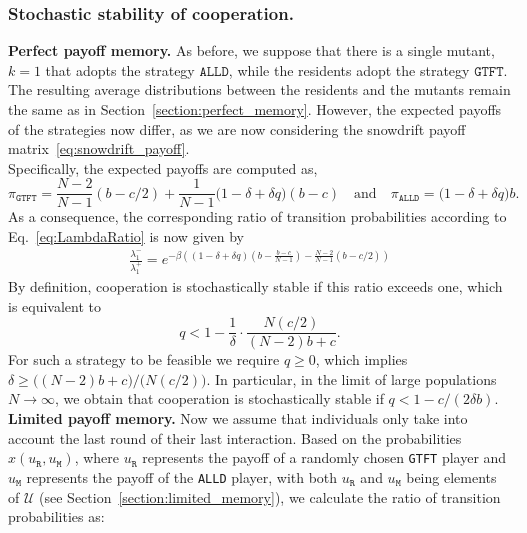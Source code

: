 \documentclass[11pt]{article}
\def\alld{\texttt{ALLD}}
\def\gtft{\texttt{GTFT}}
\def\resident{\texttt{R}}
\def\mutant{\texttt{M}}
\theoremstyle{plainCl1}
\theoremstyle{plainCl2}
\begin{document}
\subsubsection{Stochastic stability of cooperation.}\label{section:stochastic_stability_snowdrift}

{\bf Perfect payoff memory.} As before, we suppose that there is a single mutant,
\(k\!=\!1\) that adopts the strategy $\alld$, while the residents adopt the
strategy \(\gtft\). The resulting average distributions between the residents
and the mutants remain the same as in Section~\ref{section:perfect_memory}.
However, the expected payoffs of the strategies now differ, as we are now
considering the snowdrift payoff matrix~\eqref{eq:snowdrift_payoff}. \\

\noindent
Specifically, the expected payoffs are computed as,
\begin{equation*}
  \pi_\gtft =  \frac{N\!-\!2}{N-1} (b - c/2)  \!+\! \frac{1}{N-1}\big(1\!-\!\delta\!+\!\delta q\big)(b - c)
  \quad \text{and} \quad
  \pi_\alld  = \big(1\!-\!\delta\!+\!\delta q\big)b.
\end{equation*}
As a consequence, the corresponding ratio of transition probabilities according
to Eq.~\eqref{eq:LambdaRatio} is now given by
\begin{align*}
\frac{\lambda_1^{-}}{\lambda_1^{+}} = e^{-\beta \left( (1-\delta+\delta q)(b - \frac{b-c}{N-1})- \frac{N-2}{N-1}(b-c/2) \right)}
\end{align*}
By definition, cooperation is stochastically stable if this ratio exceeds one, which is equivalent to
\begin{equation}\label{Eq:Condition_PerfectMemory_Snowdrift}
q<1-\frac{1}{\delta}\cdot \frac{N(c/2)}{(N\!-\!2)b+c}.
\end{equation}
For such a strategy to be feasible we require $q\!\ge\!0$, which implies $\delta
\!\ge\! \big((N\!-\!2)b+c\big)/\big(N(c/2)\big)$. In particular, in the limit of
large populations \(N \!\rightarrow\! \infty\), we obtain that cooperation is
stochastically stable if  \(q \!<\! 1\! -\! c/(2\delta b)\). \\


\noindent
{\bf Limited payoff memory.} Now we assume that individuals
only take into account the last round of their last interaction.
Based on the probabilities \(x(u_\resident,u_\mutant)\), where \(u_\resident\)
represents the payoff of a randomly chosen \gtft{} player and \(u_\mutant\)
represents the payoff of the \alld{} player, with both \(u_\resident\) and
\(u_\mutant\) being elements of \(\mathcal{U}\) (see
Section~\ref{section:limited_memory}), we calculate the ratio of transition
probabilities as:
\end{document}
